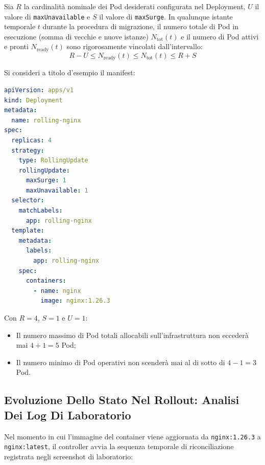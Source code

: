 \documentclass[11pt, a4paper]{article}
\begin{document}
Sia $R$ la cardinalità nominale dei Pod desiderati configurata nel Deployment, $U$ il valore di \texttt{maxUnavailable} e $S$ il valore di \texttt{maxSurge}. In qualunque istante temporale $t$ durante la procedura di migrazione, il numero totale di Pod in esecuzione (somma di vecchie e nuove istanze) $N_{\text{tot}}(t)$ e il numero di Pod attivi e pronti $N_{\text{ready}}(t)$ sono rigorosamente vincolati dall'intervallo:
\[
\boxed{R - U \le N_{\text{ready}}(t) \le N_{\text{tot}}(t) \le R + S}
\]

Si consideri a titolo d'esempio il manifest:
\begin{lstlisting}[language=yaml]
apiVersion: apps/v1
kind: Deployment
metadata:
  name: rolling-nginx
spec:
  replicas: 4
  strategy:
    type: RollingUpdate
    rollingUpdate:
      maxSurge: 1
      maxUnavailable: 1
  selector:
    matchLabels:
      app: rolling-nginx
  template:
    metadata:
      labels:
        app: rolling-nginx
    spec:
      containers:
        - name: nginx
          image: nginx:1.26.3
\end{lstlisting}

Con $R=4$, $S=1$ e $U=1$:
\begin{itemize}[noitemsep]
    \item Il numero massimo di Pod totali allocabili sull'infrastruttura non eccederà mai $4 + 1 = 5$ Pod;
    \item Il numero minimo di Pod operativi non scenderà mai al di sotto di $4 - 1 = 3$ Pod.
\end{itemize}


\subsection{Evoluzione Dello Stato Nel Rollout: Analisi Dei Log Di Laboratorio}

Nel momento in cui l'immagine del container viene aggiornata da \texttt{nginx:1.26.3} a \texttt{nginx:latest}, il controller avvia la sequenza temporale di riconciliazione registrata negli screenshot di laboratorio:
\end{document}
